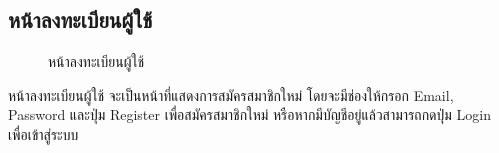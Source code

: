 \documentclass[14pt,oneside,openright,a4paper]{cpe-thai-project}
\begin{document}
\subsection{หน้าลงทะเบียนผู้ใช้}
\begin{figure}[!h]\centering
  \setlength{\fboxrule}{0.5mm} %
  \setlength{\fboxsep}{0.5cm}
  \caption{หน้าลงทะเบียนผู้ใช้}\label{fig:ui7}
\end{figure}
\hspace*{1cm} หน้าลงทะเบียนผู้ใช้ จะเป็นหน้าที่แสดงการสมัครสมาชิกใหม่ โดยจะมีช่องให้กรอก Email, Password และปุ่ม Register เพื่อสมัครสมาชิกใหม่
หรือหากมีบัญชีอยู่แล้วสามารถกดปุ่ม Login เพื่อเข้าสู่ระบบ

\newpage
\end{document}
